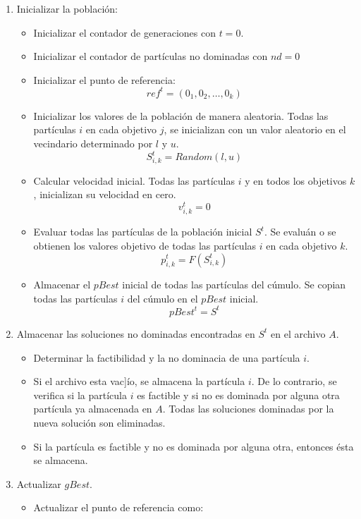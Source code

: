 \begin{enumerate}
\item Inicializar la poblaci\'on: 
      \begin{itemize}
      \item Inicializar el contador de generaciones con $t = 0$.
      \item Inicializar el contador de part\'iculas no dominadas con $nd=0$
      \item Inicializar el punto de referencia:    
      \[ref^t = \left(0_1, 0_2, \ldots, 0_k\right)\]
      \item Inicializar los valores de la poblaci\'on de manera aleatoria. Todas las part\'iculas $i$ en cada objetivo $j$,        
      se inicializan con un valor aleatorio en el vecindario determinado por $l$ y $u$.  
      \[S^t_{i,k} = Random(l, u)\]
      \item Calcular velocidad inicial. Todas las part\'iculas $i$ y en todos los objetivos $k$, inicializan su velocidad en cero.
      \[v^t_{i,k} = 0\]
      \item Evaluar todas las part\'iculas de la poblaci\'on inicial $S^t$. Se evalu\'an o se obtienen los valores objetivo de 
      todas las part\'iculas $i$ en  cada objetivo $k$. 
      \[p^t_{i,k} = F \left(S^t_{i,k} \right)\] 
      \item Almacenar el $pBest$ inicial de todas las part\'iculas del c\'umulo. Se copian todas las part\'iculas $i$ del c\'umulo 
      en el $pBest$ inicial. 
      \[pBest^t = S^t\] 
      \end{itemize}
\item Almacenar las soluciones no dominadas encontradas en $S^t$ en el archivo $A$.
      \begin{itemize}
      \item Determinar la factibilidad y la no dominacia de una part\'icula $i$.       
      \item Si el archivo esta vac]\'io, se almacena la part\'icula $i$. De lo contrario, se verifica si la part\'icula $i$ es factible 
      y si no es dominada por alguna otra part\'icula ya almacenada en $A$. Todas las soluciones dominadas por la nueva 
      soluci\'on son eliminadas. 
      \item Si la part\'icula es factible y no es dominada por alguna otra, entonces \'esta se almacena. 
      \end{itemize}
\item Actualizar $gBest$. 
      \begin{itemize}
      \item Actualizar el punto de referencia como:


\end{itemize}
\end{enumerate}
